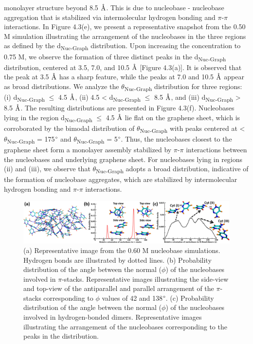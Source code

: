 monolayer structure beyond 8.5 $\text{\normalfont\AA}$. This is due to nucleobase - nucleobase aggregation that is stabilized via intermolecular hydrogen bonding and $\pi$-$\pi$ interactions. In Figure 4.3(e), we present a representative snapshot from the 0.50 M simulation illustrating the arrangement of the nucleobases in the three regions as defined by the d\textsubscript{Nuc-Graph} distribution. Upon increasing the concentration to 0.75 M, we observe the formation of three distinct peaks in the d\textsubscript{Nuc-Graph} distribution, centered at 3.5, 7.0, and 10.5 $\text{\normalfont\AA}$ [Figure 4.3(a)]. It is observed that the peak at 3.5 $\text{\normalfont\AA}$ has a sharp feature, while the peaks at 7.0 and 10.5 $\text{\normalfont\AA}$ appear as broad distributions. We analyze the $\theta$\textsubscript{Nuc-Graph} distribution for three regions: (i) d\textsubscript{Nuc-Graph} $\leq$ 4.5 $\text{\normalfont\AA}$, (ii) 4.5 < d\textsubscript{Nuc-Graph} $\leq$ 8.5 $\text{\normalfont\AA}$, and (iii) d\textsubscript{Nuc-Graph} > 8.5 $\text{\normalfont\AA}$. The resulting distributions are presented in Figure 4.3(f). Nucleobases lying in the region d\textsubscript{Nuc-Graph} $\leq$ 4.5 $\text{\normalfont\AA}$ lie flat on the graphene sheet, which is corroborated by the bimodal distribution of $\theta$\textsubscript{Nuc-Graph} with peaks centered at < $\theta$\textsubscript{Nuc-Graph} = 175$\degree$ and $\theta$\textsubscript{Nuc-Graph} = 5$\degree$. Thus, the nucleobases closest to the graphene sheet form a monolayer assembly stabilized by $\pi$-$\pi$ interactions between the nucleobases and underlying graphene sheet. For nucleobases lying in regions (ii) and (iii), we observe that $\theta$\textsubscript{Nuc-Graph} adopts a broad distribution, indicative of the formation of nucleobase aggregates, which are stabilized by intermolecular hydrogen bonding and $\pi$-$\pi$ interactions.
\begin{figure}
    \centering
    \includegraphics[width=\textwidth]{Chapter2/Figures/Figure3.png}
    \caption[Probability distributions of anngle between the normal ($\phi$) of the nucleobases involved $\pi$-stacks and hydrogen-bonded dimers. Representative structures corresponding to identified features are also presented.]{(a) Representative image from the 0.60 M nucleobase simulations. Hydrogen bonds are illustrated by dotted lines. (b) Probability distribution of the angle between the normal ($\phi$) of the nucleobases involved in $\pi$-stacks. Representative images illustrating the side-view and top-view of the antiparallel and parallel arrangement of the $\pi$-stacks corresponding to $\phi$ values of 42 and 138$\degree$. (c) Probability distribution of the angle between the normal ($\phi$) of the nucleobases involved in hydrogen-bonded dimers. Representative images illustrating the arrangement of the nucleobases corresponding to the peaks in the distribution.}
\end{figure}

